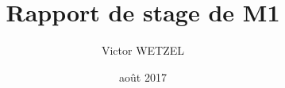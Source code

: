 

\title{Rapport de stage de M1}
\author{Victor WETZEL}
\date{août 2017}						



\title{}


\newpage
\tableofcontents

\newpage
{}%


\newpage





